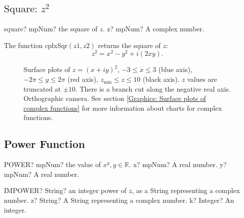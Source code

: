 \subsection{\texorpdfstring{$\text{Square: }z^2$}{Square}}

\begin{mpFunctionsExtract}
	\mpFunctionOne
	{square? mpNum? the square of $z$.}
	{z? mpNum? A complex number.}
\end{mpFunctionsExtract}

\vspace{0.3cm}
The function \textsf{cplxSqr$(z1, z2)$} returns the square of $z$: 
\begin{equation}
	z^2 = x^2-y^2 + i(2xy).
\end{equation}



\begin{figure}[ht]%
	\centering
	\qquad
	\caption[Complex Square]{Surface plots of $z = (x + iy)^2$, $-3 \leq x \leq 3$ (blue axis), $-2 \pi \leq y \leq 2\pi$ (red axis), $z_{\text{min}} \leq z \leq 10$ (black axis). $z$ values are truncated at $\pm 10$. There is a branch cut along the negative real axis. Orthographic camera. See section \ref{Graphics: Surface plots of complex functions} for more information about charts for complex functions.} 
	\label{fig:Complex Square}%
\end{figure}



\newpage
\subsection{Power Function}

\begin{mpFunctionsExtract}
	\mpWorksheetFunctionTwoNotImplemented
	{POWER? mpNum? the value of $x^y, y \in  \mathbb{R}$.}
	{x? mpNum? A real number.}
	{y? mpNum? A real number.}
\end{mpFunctionsExtract}

\vspace{0.6cm}

\begin{mpFunctionsExtract}
	\mpWorksheetFunctionTwoNotImplemented
	{IMPOWER? String? an integer power of $z$, as a String representing a complex number.}
	{z? String? A String representing a complex number.}
	{k? Integer? An integer.}
\end{mpFunctionsExtract}


